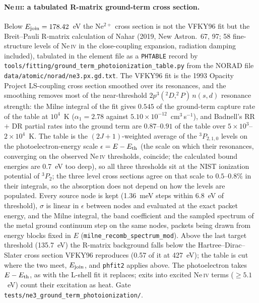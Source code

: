 \documentclass[english,a4paper]{my_memo}
\newcommand{\code}[1]{\texttt{#1}}
\begin{document}
\paragraph{Ne\,\textsc{iii}: a tabulated R-matrix ground-term cross
section.}  Below $E_{\rm join} = 178.42$~eV the Ne$^{2+}$ cross section is
not the VFKY96 fit but the Breit--Pauli R-matrix calculation of Nahar
(2019, New Astron.\ 67, 97; 58 fine-structure levels of Ne\,\textsc{iv} in
the close-coupling expansion, radiation damping included), tabulated in the
element file as a \code{PHTABLE} record by
\code{tools/fitting/ground\_term\_photoionization\_table.py} from the
NORAD file \code{data/atomic/norad/ne3.px.gd.txt}.  The VFKY96 fit is the
1993 Opacity Project LS-coupling cross section smoothed over its
resonances, and the smoothing removes most of the near-threshold
$2p^3(^2D, ^2P)\,n(s,d)$ resonance strength: the Milne integral of the fit
gives $0.545$ of the ground-term capture rate of the table at $10^4$~K
($\alpha_1 = 2.78$ against $5.10\times10^{-12}$~cm$^3$\,s$^{-1}$), and
Badnell's RR $+$ DR partial rates into the ground term are $0.87$--$0.91$
of the table over $5\times10^3$--$2\times10^4$~K.  The table is the
$(2J+1)$-weighted average of the $^3P_{2,1,0}$ levels on the
photoelectron-energy scale $\epsilon = E - E_{\rm th}$ (the scale on which
their resonances, converging on the observed Ne\,\textsc{iv} thresholds,
coincide; the calculated bound energies are 0.7~eV too deep), so all three
thresholds sit at the NIST ionization potential of $^3P_2$; the three
level cross sections agree on that scale to $0.5$--$0.8\%$ in their
integrals, so the absorption does not depend on how the levels are
populated.  Every source node is kept (1.36~meV steps within 6.8~eV of
threshold), $\sigma$ is linear in $\epsilon$ between nodes and evaluated at
the exact packet energy, and the Milne integral, the band coefficient and
the sampled spectrum of the metal ground continuum step on the same nodes,
packets being drawn from energy blocks fixed in $E$
(\code{milne\_recomb\_spectrum\_mod}).  Above the last target threshold
(135.7~eV) the R-matrix background falls below the Hartree--Dirac--Slater
cross section VFKY96 reproduces (0.57 of it at 427~eV); the table is cut
where the two meet, $E_{\rm join}$, and \code{phfit2} applies above.  The
photoelectron takes $E - E_{\rm th}$, as with the L-shell fit it
replaces; exits into excited Ne\,\textsc{iv} terms ($\ge 5.1$~eV) count
their excitation as heat.  Gate \code{tests/ne3\_ground\_term\_photoionization/}.
\end{document}
